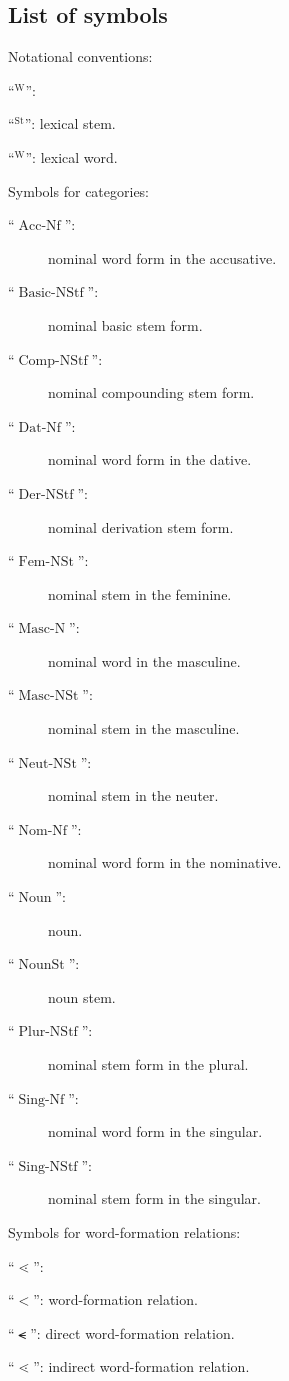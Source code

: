 \documentclass[output=paper
  ,nobabel
  ,draftmode
  ,colorlinks, citecolor=brown
]{langscibook}
\begin{document}
\subsection*{List of symbols}
Notational conventions: \begin{labeledlist}{``$\phantom{}^{\operatorname{W}}$'':}
\item[``$\phantom{}^{\operatorname{St}}$'':] lexical stem.
\item[``$\phantom{}^{\operatorname{W}}$'':] lexical word.
\end{labeledlist} Symbols for categories: \begin{description}
\item[``$\operatorname{Acc-Nf}$'':] nominal word form in the accusative.
\item[``$\operatorname{Basic-NStf}$'':] nominal basic stem form.
\item[``$\operatorname{Comp-NStf}$'':] nominal compounding stem form.
\item[``$\operatorname{Dat-Nf}$'':] nominal word form in the dative.
\item[``$\operatorname{Der-NStf}$'':] nominal derivation stem form.
\item[``$\operatorname{Fem-NSt}$'':] nominal stem in the feminine.
\item[``$\operatorname{Masc-N}$'':] nominal word in the masculine.
\item[``$\operatorname{Masc-NSt}$'':] nominal stem in the masculine.
\item[``$\operatorname{Neut-NSt}$'':] nominal stem in the neuter.
\item[``$\operatorname{Nom-Nf}$'':] nominal word form in the nominative.
\item[``$\operatorname{Noun}$'':] noun.
\item[``$\operatorname{NounSt}$'':] noun stem.
\item[``$\operatorname{Plur-NStf}$'':] nominal stem form in the plural.
\item[``$\operatorname{Sing-Nf}$'':] nominal word form in the singular.
\item[``$\operatorname{Sing-NStf}$'':] nominal stem form in the singular.
\end{description} Symbols for word-formation relations: \begin{labeledlist}{``$⋖$'':}
\item[``$<$'':] word-formation relation.
\item[``$⪪$'':] direct word-formation relation.
\item[``$⋖$'':] indirect word-formation relation.

\end{labeledlist}
\end{document}
